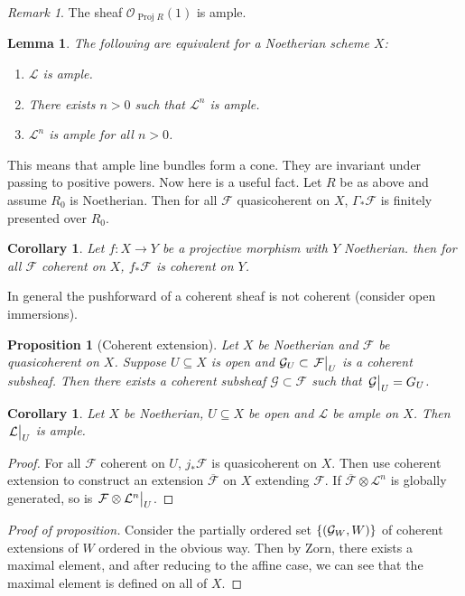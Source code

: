 \documentclass[leqno, openany]{memoir}
\newtheorem{cor}[thm]{Corollary}
\newtheorem{prop}[thm]{Proposition}
\newtheorem{lem}[thm]{Lemma}
\theoremstyle{definition}
\theoremstyle{remark}
\newtheorem{rmk}[thm]{Remark}
\theoremstyle{plain}
\theoremstyle{definition}
\theoremstyle{remark}
\newcommand{\mc}[1]{\mathcal{#1}}
\newcommand{\ol}[1]{\overline{#1}}
\DeclareMathOperator{\Proj}{Proj}
\begin{document}
\begin{rmk} The sheaf $\mc{O}_{\Proj R}(1)$ is ample.  \end{rmk}

\begin{lem} The following are equivalent for a Noetherian scheme $X$:
\begin{enumerate} \item $\mc{L}$ is ample.  \item There exists $n > 0$ such
that $\mc{L}^n$ is ample.  \item $\mc{L}^n$ is ample for all $n>0$.
\end{enumerate} \end{lem}

This means that ample line bundles form a cone. They are invariant under
passing to positive powers. Now here is a useful fact. Let $R$ be as above and
assume $R_0$ is Noetherian. Then for all $\mc{F}$ quasicoherent on $X$,
$\Gamma_* \mc{F}$ is finitely presented over $R_0$.

\begin{cor} Let $f \colon X \to Y$ be a projective morphism with $Y$
Noetherian. then for all $\mc{F}$ coherent on $X$, $f_* \mc{F}$ is coherent on
$Y$.  \end{cor}

In general the pushforward of a coherent sheaf is not coherent (consider open
immersions).

\begin{prop}[Coherent extension] Let $X$ be Noetherian and $\mc{F}$ be
    quasicoherent on $X$. Suppose $U \subseteq X$ is open and $\mc{G}_U \subset
    \eval{\mc{F}}_U$ is a coherent subsheaf. Then there exists a coherent
    subsheaf $\mc{G} \subset \mc{F}$ such that $\eval{\mc{G}}_U = G_U$.
\end{prop}

\begin{cor} Let $X$ be Noetherian, $U \subseteq X$ be open and $\mc{L}$ be
ample on $X$. Then $\eval{\mc{L}}_U$ is ample.  \end{cor}

\begin{proof} For all $\mc{F}$ coherent on $U$, $j_* \mc{F}$ is quasicoherent
    on $X$. Then use coherent extension to construct an extension $\ol{\mc{F}}$
    on $X$ extending $\mc{F}$. If $\ol{\mc{F}} \otimes \mc{L}^n$ is globally
    generated, so is $\eval{\mc{F} \otimes \mc{L}^n}_U$.  \end{proof}

\begin{proof}[Proof of proposition] Consider the partially ordered set $\qty{
    (\mc{G}_W,W) }$ of coherent extensions of $W$ ordered in the obvious way.
    Then by Zorn, there exists a maximal element, and after reducing to the
    affine case, we can see that the maximal element is defined on all of $X$.
\end{proof}
\end{document}
